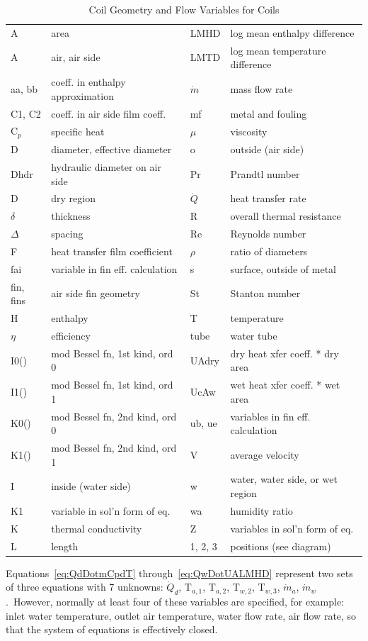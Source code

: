 \begin{longtable}[c]{|p{1.0in}p{2.0in}|p{1.0in}p{2.0in}|}
\caption{Coil Geometry and Flow Variables for Coils \label{table:coil-geometry-and-flow-variables-for-coils}} \tabularnewline
\toprule 
\endfirsthead

\caption[]{Coil Geometry and Flow Variables for Coils} \tabularnewline
\toprule 
\endhead

A & area & LMHD & log mean enthalpy difference \tabularnewline
A & air, air side & LMTD & log mean temperature difference \tabularnewline
aa, bb & coeff. in enthalpy approximation & $\dot m$ & mass flow rate \tabularnewline
C1, C2 & coeff. in air side film coeff. & mf & metal and fouling \tabularnewline
C\(_p\) & specific heat & $\mu$ & viscosity \tabularnewline
D & diameter, effective diameter & o & outside (air side) \tabularnewline
Dhdr & hydraulic diameter on air side & Pr & Prandtl number \tabularnewline
D & dry region & $\dot Q$ & heat transfer rate \tabularnewline
$\delta$ & thickness & R & overall thermal resistance \tabularnewline
$\Delta$ & spacing & Re & Reynolds number \tabularnewline
F & heat transfer film coefficient & $\rho$ & ratio of diameters \tabularnewline
fai & variable in fin eff. calculation & s & surface, outside of metal \tabularnewline
fin, fins & air side fin geometry & St & Stanton number \tabularnewline
H & enthalpy & T & temperature \tabularnewline
$\eta$ & efficiency & tube & water tube \tabularnewline
I0() & mod Bessel fn, 1st kind, ord 0 & UAdry & dry heat xfer coeff. * dry area \tabularnewline
I1() & mod Bessel fn, 1st kind, ord 1 & UcAw & wet heat xfer coeff. * wet area \tabularnewline
K0() & mod Bessel fn, 2nd kind, ord 0 & ub, ue & variables in fin eff. calculation \tabularnewline
K1() & mod Bessel fn, 2nd kind, ord 1 & V & average velocity \tabularnewline
I & inside (water side) & w & water, water side, or wet region \tabularnewline
K1 & variable in sol'n form of eq. & wa & humidity ratio \tabularnewline
K & thermal conductivity & Z & variables in sol'n form of eq. \tabularnewline
L & length & 1, 2, 3 & positions (see diagram) \tabularnewline
\bottomrule
\end{longtable}

Equations~\ref{eq:QdDotmCpdT} through~\ref{eq:QwDotUALMHD} represent two sets of three equations with 7 unknowns: \({\dot Q_d}\), T\(_{a,1}\), T\(_{a,2}\), T\(_{w,2}\), T\(_{w,3}\), \({\dot m_a}\), \({\dot m_w}\).~However, normally at least four of these variables are specified, for example: inlet water temperature, outlet air temperature, water flow rate, air flow rate, so that the system of equations is effectively closed.

